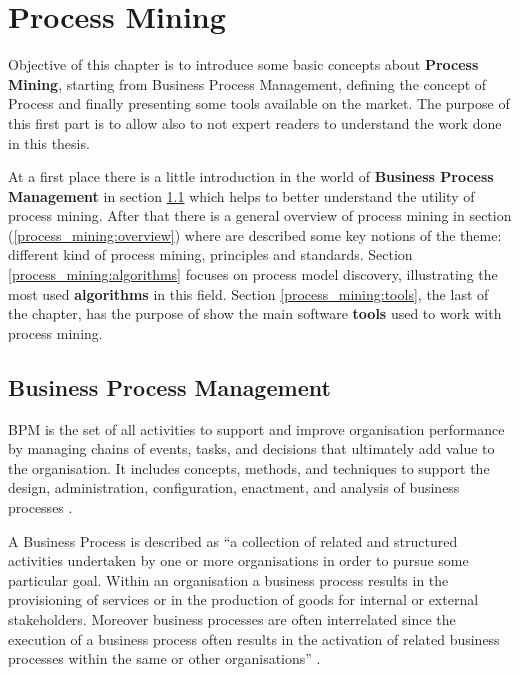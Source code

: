 \chapter{Process Mining}
\label{process_mining}

Objective of this chapter is to introduce some basic concepts about \textbf{Process Mining}, starting from Business Process 
Management, defining the concept of Process and finally presenting some tools available on the market. The purpose of this 
first part is to allow also to not expert readers to understand the work done in this thesis.

At a first place there is a little introduction in the world of \textbf{Business Process Management} in section 
\ref{process_mining:bpm} which helps to better understand the utility of process mining.
After that there is a general overview of process mining in section (\ref{process_mining:overview}) where are described some 
key notions of the theme: different kind of process mining, principles and standards.
Section \ref{process_mining:algorithms} focuses on process model discovery, illustrating the most used \textbf{algorithms} in 
this field.
Section \ref{process_mining:tools}, the last of the chapter, has the purpose of show the main software \textbf{tools} used to 
work with process mining.


\section{Business Process Management}
\label{process_mining:bpm}
BPM is the set of all activities to support and improve organisation performance by managing chains of events, tasks, and 
decisions that ultimately add value to the organisation. It includes concepts, methods, and techniques to support the design, 
administration, configuration, enactment, and analysis of business processes \cite{DBLP:books/WeskeBPM}.

A Business Process is described as “a collection of related and structured activities undertaken by one or more organisations 
in order to pursue some particular goal. Within an organisation a business process results in the provisioning of services or 
in the production of goods for internal or external stakeholders. Moreover business processes are often interrelated since 
the execution of a business process often results in the activation of related business processes within the same or other 
organisations” \cite{DBLP:journals/infsof/LindsayDL03}.

